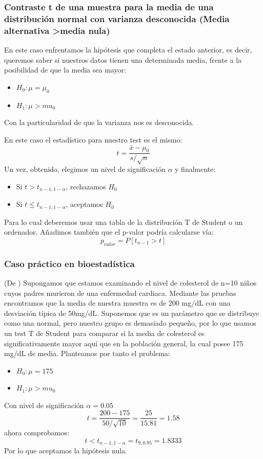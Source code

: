 \documentclass[a4paper,12pt]{article}
\begin{document}
 \subsubsection{Contraste t de una muestra para la media de una distribución normal con varianza desconocida (Media alternativa >media nula)}
 En este caso enfrentamos la hipótesis que completa el estado anterior, es decir, queremos saber si nuestros datos tienen una determinada media, frente a la posibilidad  de que la media sea mayor: 
 \begin{itemize}
 	\item $H_0:\mu=\mu_0$
 	\item $H_1: \mu>mu_0$
 \end{itemize}
 Con la particularidad de que la varianza nos es desconocida.
 
 En este caso el estadístico para nuestro test es el mismo: 
 $$t=\frac{\bar{x}-\mu_0}{s/\sqrt{n}}$$
 Un vez, obtenido, elegimos un nivel de significación $\alpha$ y finalmente:
 \begin{itemize}
 	\item Si $t>t_{n-1,1-\alpha}$, rechazamos $H_0$
 	\item Si $t\leq t_{n-1,1-\alpha}$, aceptamos $H_0$
 \end{itemize}
 Para lo cual deberemos usar una tabla de la distribución T de Student o un ordenador.
 Añadimos también que el p-valor podría calcularse vía:
 $$p_{valor}=P[t_{n-1}> t]$$
 
 \subsubsection*{Caso práctico en bioestadística}
 (De \cite{rosner2015fundamentals}) 
Supongamos que estamos examinando el nivel de colesterol de n=10 niños cuyos padres murieron de una enfermedad cardiaca. Mediante las pruebas encontramos que la media de nuestra muestra es de 200 mg/dL con una desviación típica de 50mg/dL. Suponemos que es un parámetro que se distribuye como una normal, pero nuestro grupo es demasiado pequeño, por lo que usamos un test T de Student para comparar si la media de colesterol es significativamente mayor aquí que en la población general, la cual posee 175 mg/dL de media.
Planteamos por tanto el problema:
\begin{itemize}
	\item $H_0:\mu=175$
	\item $H_1: \mu>mu_0$
\end{itemize}
Con nivel de significación $\alpha=0.05$
$$t=\frac{200-175}{50/\sqrt{10}}=\frac{25}{15.81}=1.58$$
ahora comprobamos:
$$t<t_{n-1,1-\alpha}=t_{9,0.95}=1.8333$$
Por lo que aceptamos la hipótesis nula.
\end{document}
